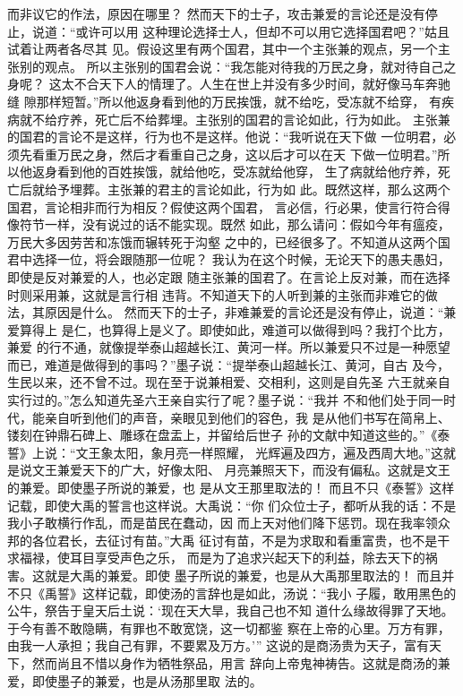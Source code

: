 \documentclass[12pt,UTF8]{ctexbook}
\begin{document}
而非议它的作法，原因在哪里？ 
然而天下的士子，攻击兼爱的言论还是没有停止，说道：“或许可以用 
这种理论选择士人，但却不可以用它选择国君吧？”姑且试着让两者各尽其 
见。假设这里有两个国君，其中一个主张兼的观点，另一个主张别的观点。 
所以主张别的国君会说：“我怎能对待我的万民之身，就对待自己之身呢？ 
这太不合天下人的情理了。人生在世上并没有多少时间，就好像马车奔驰缝 
隙那样短暂。”所以他返身看到他的万民挨饿，就不给吃，受冻就不给穿， 
有疾病就不给疗养，死亡后不给葬埋。主张别的国君的言论如此，行为如此。 
主张兼的国君的言论不是这样，行为也不是这样。他说：“我听说在天下做 
一位明君，必须先看重万民之身，然后才看重自己之身，这以后才可以在天 
下做一位明君。”所以他返身看到他的百姓挨饿，就给他吃，受冻就给他穿， 
生了病就给他疗养，死亡后就给予埋葬。主张兼的君主的言论如此，行为如 
此。既然这样，那么这两个国君，言论相非而行为相反？假使这两个国君， 
言必信，行必果，使言行符合得像符节一样，没有说过的话不能实现。既然 
如此，那么请问：假如今年有瘟疫，万民大多因劳苦和冻饿而辗转死于沟壑 
之中的，已经很多了。不知道从这两个国君中选择一位，将会跟随那一位呢？ 
我认为在这个时候，无论天下的愚夫愚妇，即使是反对兼爱的人，也必定跟 
随主张兼的国君了。在言论上反对兼，而在选择时则采用兼，这就是言行相 
违背。不知道天下的人听到兼的主张而非难它的做法，其原因是什么。 
然而天下的士子，非难兼爱的言论还是没有停止，说道：“兼爱算得上 
是仁，也算得上是义了。即使如此，难道可以做得到吗？我打个比方，兼爱 
的行不通，就像提举泰山超越长江、黄河一样。所以兼爱只不过是一种愿望 
而已，难道是做得到的事吗？”墨子说：“提举泰山超越长江、黄河，自古 
及今，生民以来，还不曾不过。现在至于说兼相爱、交相利，这则是自先圣 
六王就亲自实行过的。”怎么知道先圣六王亲自实行了呢？墨子说：“我并 
不和他们处于同一时代，能亲自听到他们的声音，亲眼见到他们的容色，我 
是从他们书写在简帛上、镂刻在钟鼎石碑上、雕琢在盘盂上，并留给后世子 
孙的文献中知道这些的。”《泰誓》上说：“文王象太阳，象月亮一样照耀， 
光辉遍及四方，遍及西周大地。”这就是说文王兼爱天下的广大，好像太阳、 
月亮兼照天下，而没有偏私。这就是文王的兼爱。即使墨子所说的兼爱，也 
是从文王那里取法的！ 
而且不只《泰誓》这样记载，即使大禹的誓言也这样说。大禹说：“你 
们众位士子，都听从我的话：不是我小子敢横行作乱，而是苗民在蠢动，因 
而上天对他们降下惩罚。现在我率领众邦的各位君长，去征讨有苗。”大禹 
征讨有苗，不是为求取和看重富贵，也不是干求福禄，使耳目享受声色之乐， 
而是为了追求兴起天下的利益，除去天下的祸害。这就是大禹的兼爱。即使 
墨子所说的兼爱，也是从大禹那里取法的！ 
而且并不只《禹誓》这样记载，即使汤的言辞也是如此，汤说：“我小 
子履，敢用黑色的公牛，祭告于皇天后土说：‘现在天大旱，我自己也不知 
道什么缘故得罪了天地。于今有善不敢隐瞒，有罪也不敢宽饶，这一切都鉴 
察在上帝的心里。万方有罪，由我一人承担；我自己有罪，不要累及万方。’” 
这说的是商汤贵为天子，富有天下，然而尚且不惜以身作为牺牲祭品，用言 
辞向上帝鬼神祷告。这就是商汤的兼爱，即使墨子的兼爱，也是从汤那里取 
法的。 
\end{document}
